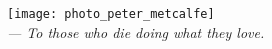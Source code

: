 %
%

\pubmode
	\onecolumngrid
\fi

\vspace*{180pt}
\begin{center}
	\texttt{[image: photo\_peter\_metcalfe]}\\
	\textit{--- To those who die doing what they love.}
\end{center}
\newpage

\pubmode
	\twocolumngrid
\fi
